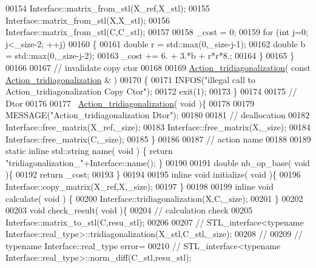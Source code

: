 \begin{DoxyCode}
00154     Interface::matrix\_from\_stl(X\_ref,X\_stl);
00155     Interface::matrix\_from\_stl(X,X\_stl);
00156     Interface::matrix\_from\_stl(C,C\_stl);
00157 
00158     \_cost = 0;
00159     \textcolor{keywordflow}{for} (\textcolor{keywordtype}{int} j=0; j<\_size-2; ++j)
00160     \{
00161       \textcolor{keywordtype}{double} r = std::max(0,\_size-j-1);
00162       \textcolor{keywordtype}{double} b = std::max(0,\_size-j-2);
00163       \_cost += 6. + 3.*b + r*r*8.;
00164     \}
00165   \}
00166 
00167   \textcolor{comment}{// invalidate copy ctor}
00168 
00169   \hyperlink{class_action__tridiagonalization}{Action\_tridiagonalization}( \textcolor{keyword}{const}  
      \hyperlink{class_action__tridiagonalization}{Action\_tridiagonalization} & )
00170   \{
00171     INFOS(\textcolor{stringliteral}{"illegal call to Action\_tridiagonalization Copy Ctor"});
00172     exit(1);
00173   \}
00174 
00175   \textcolor{comment}{// Dtor}
00176 
00177   ~\hyperlink{class_action__tridiagonalization}{Action\_tridiagonalization}( \textcolor{keywordtype}{void} )\{
00178 
00179     MESSAGE(\textcolor{stringliteral}{"Action\_tridiagonalization Dtor"});
00180 
00181     \textcolor{comment}{// deallocation}
00182     Interface::free\_matrix(X\_ref,\_size);
00183     Interface::free\_matrix(X,\_size);
00184     Interface::free\_matrix(C,\_size);
00185   \}
00186 
00187   \textcolor{comment}{// action name}
00188 
00189   \textcolor{keyword}{static} \textcolor{keyword}{inline} std::string name( \textcolor{keywordtype}{void} ) \{ \textcolor{keywordflow}{return} \textcolor{stringliteral}{"tridiagonalization\_"}+Interface::name(); \}
00190 
00191   \textcolor{keywordtype}{double} nb\_op\_base( \textcolor{keywordtype}{void} )\{
00192     \textcolor{keywordflow}{return} \_cost;
00193   \}
00194 
00195   \textcolor{keyword}{inline} \textcolor{keywordtype}{void} initialize( \textcolor{keywordtype}{void} )\{
00196     Interface::copy\_matrix(X\_ref,X,\_size);
00197   \}
00198 
00199   \textcolor{keyword}{inline} \textcolor{keywordtype}{void} calculate( \textcolor{keywordtype}{void} ) \{
00200       Interface::tridiagonalization(X,C,\_size);
00201   \}
00202 
00203   \textcolor{keywordtype}{void} check\_result( \textcolor{keywordtype}{void} )\{
00204     \textcolor{comment}{// calculation check}
00205     Interface::matrix\_to\_stl(C,resu\_stl);
00206 
00207 \textcolor{comment}{//     STL\_interface<typename Interface::real\_type>::tridiagonalization(X\_stl,C\_stl,\_size);}
00208 \textcolor{comment}{//}
00209 \textcolor{comment}{//     typename Interface::real\_type error=}
00210 \textcolor{comment}{//       STL\_interface<typename Interface::real\_type>::norm\_diff(C\_stl,resu\_stl);}

\end{DoxyCode}
